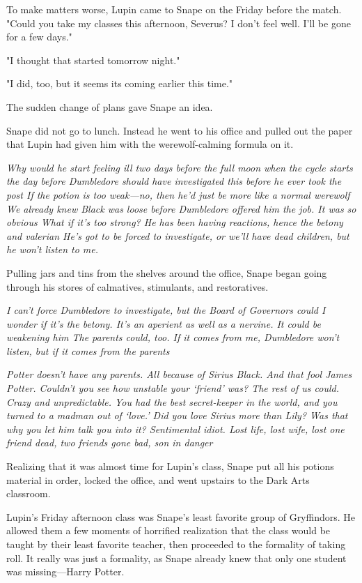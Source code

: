 To make matters worse, Lupin came to Snape on the Friday before the match. "Could you take my classes this afternoon, Severus? I don't feel well. I'll be gone for a few days."

"I thought that started tomorrow night."

"I did, too, but it seems its coming earlier this time."

The sudden change of plans gave Snape an idea.

Snape did not go to lunch. Instead he went to his office and pulled out the paper that Lupin had given him with the werewolf-calming formula on it.

\emph{Why would he start feeling ill two days before the full moon when the cycle starts the day before{\el} Dumbledore should have investigated this before he ever took the post{\el} If the potion is too weak—no, then he'd just be more like a normal werewolf{\el} We already knew Black was loose before Dumbledore offered him the job. It was so obvious{\el} What if it's too strong? He has been having reactions, hence the betony and valerian{\el} He's got to be forced to investigate, or we'll have dead children, but he won't listen to me.}

Pulling jars and tins from the shelves around the office, Snape began going through his stores of calmatives, stimulants, and restoratives.

\emph{I can't force Dumbledore to investigate, but the Board of Governors could{\el} I wonder if it's the betony. It's an aperient as well as a nervine. It could be weakening him{\el} The parents could, too. If it comes from me, Dumbledore won't listen, but if it comes from the parents{\el}}

\emph{Potter doesn't have any parents. All because of Sirius Black. And that fool James Potter. Couldn't you see how unstable your `friend' was? The rest of us could. Crazy and unpredictable. You had the best secret-keeper in the world, and you turned to a madman out of `love.' Did you love Sirius more than Lily? Was that why you let him talk you into it? Sentimental idiot. Lost life, lost wife, lost one friend dead, two friends gone bad, son in danger{\el}}

Realizing that it was almost time for Lupin's class, Snape put all his potions material in order, locked the office, and went upstairs to the Dark Arts classroom.

Lupin's Friday afternoon class was Snape's least favorite group of Gryffindors. He allowed them a few moments of horrified realization that the class would be taught by their least favorite teacher, then proceeded to the formality of taking roll. It really was just a formality, as Snape already knew that only one student was missing—Harry Potter.

